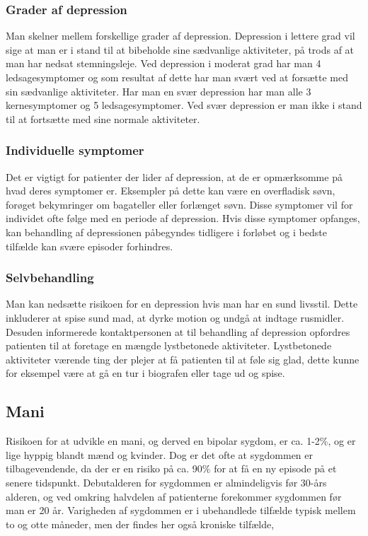 \subsubsection{Grader af depression}
Man skelner mellem forskellige grader af depression.
Depression i lettere grad vil sige at man er i stand til at bibeholde sine sædvanlige aktiviteter, på trods af at man har nedsat stemningsleje.
Ved depression i moderat grad har man 4 ledsagesymptomer og som resultat af dette har man svært ved at forsætte med sin sædvanlige aktiviteter.
Har man en svær depression har man alle 3 kernesymptomer og 5 ledsagesymptomer.
Ved svær depression er man ikke i stand til at fortsætte med sine normale aktiviteter.

\subsubsection{Individuelle symptomer}
Det er vigtigt for patienter der lider af depression, at de er opmærksomme på hvad deres symptomer er.
Eksempler på dette kan være en overfladisk søvn, forøget bekymringer om bagateller eller forlænget søvn.
Disse symptomer vil for individet ofte følge med en periode af depression.
Hvis disse symptomer opfanges, kan behandling af depressionen påbegyndes tidligere i forløbet og i bedste tilfælde kan svære episoder forhindres.
\subsubsection{Selvbehandling}
Man kan nedsætte risikoen for en depression hvis man har en sund livsstil.
Dette inkluderer at spise sund mad, at dyrke motion og undgå at indtage rusmidler.
Desuden informerede kontaktpersonen \citet{misc:janne-rasmussen} at til behandling af depression opfordres patienten til at foretage en mængde lystbetonede aktiviteter.
Lystbetonede aktiviteter værende ting der plejer at få patienten til at føle sig glad, dette kunne for eksempel være at gå en tur i biografen eller tage ud og spise. 

\subsection{Mani}
Risikoen for at udvikle en mani, og derved en bipolar sygdom, er ca. 1-2\%, og er lige hyppig blandt mænd og kvinder.
Dog er det ofte at sygdommen er tilbagevendende, da der er en risiko på ca. 90\% for at få en ny episode på et senere tidspunkt.
Debutalderen for sygdommen er almindeligvis før 30-års alderen, og ved omkring halvdelen af patienterne forekommer sygdommen før man er 20 år.
Varigheden af sygdommen er i ubehandlede tilfælde typisk mellem to og otte måneder, men der findes her også kroniske tilfælde,

